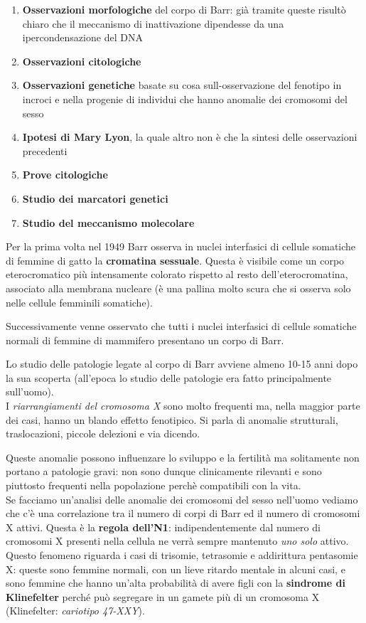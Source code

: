 \documentclass[11pt]{book}
\begin{document}
\begin{enumerate}
\item \textbf{Osservazioni morfologiche} del corpo di Barr: già tramite queste risultò chiaro che il meccanismo di inattivazione dipendesse da una ipercondensazione del DNA
\item \textbf{Osservazioni citologiche}
\item \textbf{Osservazioni genetiche} basate su cosa sull-osservazione del fenotipo in incroci e nella progenie di individui che hanno anomalie dei cromosomi del sesso
\item \textbf{Ipotesi di Mary Lyon}, la quale altro non è che la sintesi delle osservazioni precedenti 
\item \textbf{Prove citologiche}
\item \textbf{Studio dei marcatori genetici}
\item \textbf{Studio del meccanismo molecolare}
\end{enumerate} 

Per la prima volta nel 1949 Barr osserva in nuclei interfasici di cellule somatiche di femmine di gatto la \textbf{cromatina sessuale}. Questa è visibile come un corpo eterocromatico più intensamente colorato rispetto al resto dell’eterocromatina, associato alla membrana nucleare (è una pallina molto scura che si osserva solo nelle cellule femminili somatiche).

Successivamente venne osservato che tutti i nuclei interfasici di cellule somatiche normali di femmine di mammifero presentano un corpo di Barr.

Lo studio delle patologie legate al corpo di Barr avviene almeno 10-15 anni dopo la sua scoperta (all’epoca lo studio delle patologie era fatto principalmente sull’uomo).\\
I \emph{riarrangiamenti del cromosoma X} sono molto frequenti ma, nella maggior parte dei casi, hanno un blando effetto fenotipico. Si parla di anomalie strutturali, traslocazioni, piccole delezioni e via dicendo.

Queste anomalie possono influenzare lo sviluppo e la fertilità ma solitamente non portano a patologie gravi: non sono dunque clinicamente rilevanti e sono piuttosto frequenti nella popolazione perchè compatibili con la vita.\\
Se facciamo un’analisi delle anomalie dei cromosomi del sesso nell’uomo vediamo che c’è una correlazione tra il numero di corpi di Barr ed il numero di cromosomi X attivi. Questa è la \textbf{regola dell’N1}: indipendentemente dal numero di cromosomi X presenti nella cellula ne verrà sempre mantenuto \emph{uno solo} attivo. Questo fenomeno riguarda i casi di trisomie, tetrasomie e addirittura pentasomie X: queste sono femmine normali, con un lieve ritardo mentale in alcuni casi, e sono femmine che hanno un’alta probabilità di avere figli con la \textbf{sindrome di Klinefelter} perché può segregare in un gamete più di un cromosoma X (Klinefelter: \emph{cariotipo 47-XXY}). 
\end{document}
